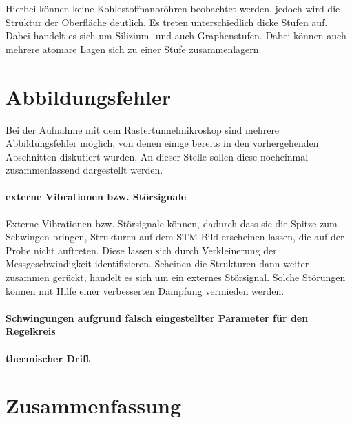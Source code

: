 \documentclass[a4paper,twoside,final]{article}
\begin{document}
Hierbei können keine Kohlestoffnanoröhren beobachtet werden, jedoch wird die Struktur der Oberfläche deutlich. Es treten unterschiedlich dicke Stufen auf. Dabei handelt es sich um Silizium- und auch Graphenstufen. Dabei können auch mehrere atomare Lagen sich zu einer Stufe zusammenlagern.

\section{Abbildungsfehler}
Bei der Aufnahme mit dem Rastertunnelmikroskop sind mehrere Abbildungsfehler möglich, von denen einige bereits in den vorhergehenden Abschnitten diskutiert wurden. An dieser Stelle sollen diese nocheinmal zusammenfassend dargestellt werden.
\paragraph{externe Vibrationen bzw. Störsignale}
Externe Vibrationen bzw. Störsignale können, dadurch dass sie die Spitze zum Schwingen bringen, Strukturen auf dem STM-Bild erscheinen lassen, die auf der Probe nicht auftreten. Diese lassen sich durch Verkleinerung der Messgeschwindigkeit identifizieren. Scheinen die Strukturen dann weiter zusammen gerückt, handelt es sich um ein externes Störsignal. Solche Störungen können mit Hilfe einer verbesserten Dämpfung vermieden werden.

\paragraph{Schwingungen aufgrund falsch eingestellter Parameter für den Regelkreis}


\paragraph{thermischer Drift}


\section{Zusammenfassung}
\end{document}
